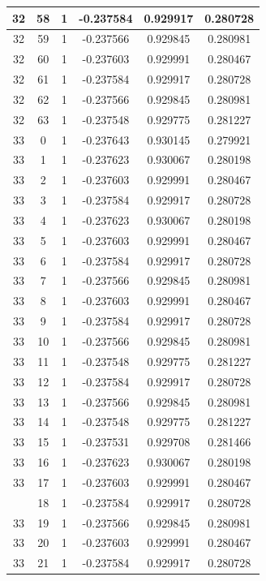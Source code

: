 \documentclass[12pt,a4paper]{article}
\numberwithin{equation}{section}
\numberwithin{figure}{section}
\numberwithin{table}{section}
\begin{document}
\begin{longtable}{|c|c|c|c|c|c|}
32 & 58 & 1 & -0.237584 & 0.929917 & 0.280728 \\ \hline
32 & 59 & 1 & -0.237566 & 0.929845 & 0.280981 \\ \hline
32 & 60 & 1 & -0.237603 & 0.929991 & 0.280467 \\ \hline
32 & 61 & 1 & -0.237584 & 0.929917 & 0.280728 \\ \hline
32 & 62 & 1 & -0.237566 & 0.929845 & 0.280981 \\ \hline
32 & 63 & 1 & -0.237548 & 0.929775 & 0.281227 \\ \hline
33 & 0 & 1 & -0.237643 & 0.930145 & 0.279921 \\ \hline
33 & 1 & 1 & -0.237623 & 0.930067 & 0.280198 \\ \hline
33 & 2 & 1 & -0.237603 & 0.929991 & 0.280467 \\ \hline
33 & 3 & 1 & -0.237584 & 0.929917 & 0.280728 \\ \hline
33 & 4 & 1 & -0.237623 & 0.930067 & 0.280198 \\ \hline
33 & 5 & 1 & -0.237603 & 0.929991 & 0.280467 \\ \hline
33 & 6 & 1 & -0.237584 & 0.929917 & 0.280728 \\ \hline
33 & 7 & 1 & -0.237566 & 0.929845 & 0.280981 \\ \hline
33 & 8 & 1 & -0.237603 & 0.929991 & 0.280467 \\ \hline
33 & 9 & 1 & -0.237584 & 0.929917 & 0.280728 \\ \hline
33 & 10 & 1 & -0.237566 & 0.929845 & 0.280981 \\ \hline
33 & 11 & 1 & -0.237548 & 0.929775 & 0.281227 \\ \hline
33 & 12 & 1 & -0.237584 & 0.929917 & 0.280728 \\ \hline
33 & 13 & 1 & -0.237566 & 0.929845 & 0.280981 \\ \hline
33 & 14 & 1 & -0.237548 & 0.929775 & 0.281227 \\ \hline
33 & 15 & 1 & -0.237531 & 0.929708 & 0.281466 \\ \hline
33 & 16 & 1 & -0.237623 & 0.930067 & 0.280198 \\ \hline
33 & 17 & 1 & -0.237603 & 0.929991 & 0.280467 \\ \hline
\pagebreak
33 & 18 & 1 & -0.237584 & 0.929917 & 0.280728 \\ \hline
33 & 19 & 1 & -0.237566 & 0.929845 & 0.280981 \\ \hline
33 & 20 & 1 & -0.237603 & 0.929991 & 0.280467 \\ \hline
33 & 21 & 1 & -0.237584 & 0.929917 & 0.280728 \\ \hline

\end{longtable}
\end{document}

